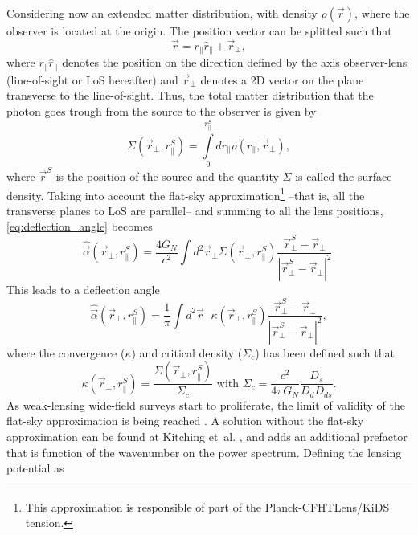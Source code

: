 Considering now an extended matter distribution, with density $\rho(\vec r)$, where the observer is located at the origin. The position vector can be splitted such that
\begin{equation}
\vec r = r_\parallel \hat r_\parallel + \vec r_\perp,
\end{equation}
where $r_\parallel\hat r_\parallel$ denotes the position on the direction defined by the axis observer-lens (line-of-sight or LoS hereafter) and $\vec r_\perp$ denotes a 2D vector on the plane transverse to the line-of-sight. Thus, the total matter distribution that the photon goes trough from the source to the observer is given by
\begin{equation}
\Sigma(\vec r_\perp,r_\parallel^S) = \int\limits_0^{r_\parallel^S} dr_\parallel\rho(r_\parallel,\vec r_\perp),
\label{eq:surface_density}
\end{equation}
where $\vec r^S$ is the position of the source and the quantity $\Sigma$ is called the surface density. Taking into account the flat-sky approximation\footnote{This approximation is responsible of part of the Planck-CFHTLens/KiDS tension.} --that is, all the transverse planes to LoS are parallel-- and summing to all the lens positions, \autoref{eq:deflection_angle} becomes
\begin{equation}
\hat\vec\alpha(\vec r_\perp,r_\parallel^S) = \frac{4G_N}{c^2}\int d^2\vec r_\perp \Sigma(\vec r_\perp,r_\parallel^S)\frac{\vec r^S_\perp-\vec r_\perp}{|\vec r^S_\perp-\vec r_\perp|^2}.
\end{equation}
This leads to a deflection angle
\begin{equation}
\hat \vec\alpha(\vec r_\perp,r_\parallel^S) = \frac1{\pi}\int d^2\vec r_\perp\kappa(\vec r_\perp,r_\parallel^S)\frac{\vec r^S_\perp-\vec r_\perp}{|\vec r^S_\perp-\vec r_\perp|^2},
\end{equation}
where the convergence ($\kappa$) and critical density ($\Sigma_c$) has been defined such that
\begin{equation}
\kappa(\vec r_\perp,r_\parallel^S) = \frac{\Sigma(\vec r_\perp,r_\parallel^S)}{\Sigma_c} \mbox{ with } \Sigma_c = \frac{c^2}{4\pi G_N}\frac{D_s}{D_dD_{ds}}.
\label{eq:kappa_definition}
\end{equation}
As weak-lensing wide-field surveys start to proliferate, the limit of validity of the flat-sky approximation is being reached \cite{2017arXiv170205301K,2017arXiv170401054L}. A solution without the flat-sky approximation can be found at Kitching et~al. \cite{2016arXiv161104954K}, and adds an additional prefactor that is function of the wavenumber on the power spectrum. Defining the lensing potential as

